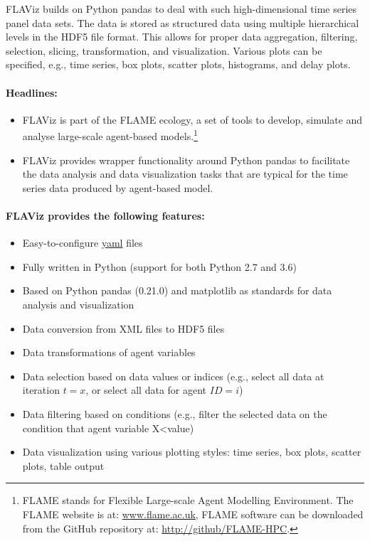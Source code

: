 \documentclass[10pt,a4paper]{article}
\begin{document}
FLAViz builds on Python pandas to deal with such high-dimensional time series panel data sets.
The data is stored as structured data using multiple hierarchical levels in the HDF5 file format.
This allows for proper data aggregation, filtering, selection, slicing, transformation, and visualization.
Various plots can be specified, e.g., time series, box plots, scatter plots, histograms, and delay plots. 

\paragraph{Headlines:}

\begin{itemize}
\item FLAViz is part of the FLAME ecology, a set of tools to develop, simulate and analyse large-scale agent-based models.\footnote{FLAME stands for Flexible Large-scale Agent Modelling Environment. The FLAME website is at: \href{www.flame.ac.uk}{www.flame.ac.uk}, FLAME software can be downloaded from the GitHub repository at: \href{http://github/FLAME-HPC}{http://github/FLAME-HPC}.}

\item FLAViz provides wrapper functionality around Python pandas to facilitate the data analysis and data visualization tasks that are typical for the time series data produced by agent-based model.
\end{itemize}


\paragraph{FLAViz provides the following features:}

\begin{itemize}
\item Easy-to-configure \url{yaml} files

\item Fully written in Python (support for both Python 2.7 and 3.6)

\item Based on Python pandas (0.21.0) and matplotlib as standards for data analysis and visualization

\item Data conversion from XML files to HDF5 files

\item Data transformations of agent variables

\item Data selection based on data values or indices (e.g., select all data at iteration $t=x$, or select all data for agent $ID=i$)

\item Data filtering based on conditions (e.g., filter the selected data on the condition that agent variable X<value)

\item Data visualization using various plotting styles: time series, box plots, scatter plots, table output
\end{itemize}
\end{document}

